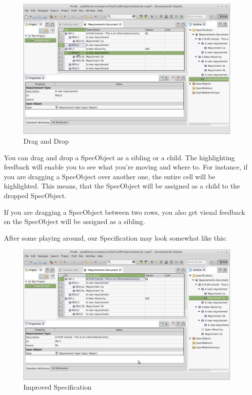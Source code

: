 \begin{figure}[h!]
\centering
\includegraphics[width=\linewidth]{../rmf-images/draganddrop.png}    
\caption{Drag and Drop}      
\label{fig:dragAndDropChild}
\end{figure}
You can drag and drop a SpecObject as a sibling or a child.  The
highlighting feedback will enable you to see what you're moving and where to.  For instance, if you are dragging a SpecObject over another one, the entire cell will be
highlighted.  This means, that the SpecObject will be assigned as a
child to the dropped SpecObject.

If you are dragging a SpecObject between two rows, you also get visual
feedback sn the SpecObject will be assigned as a sibling.

After some playing around, our Specification may look somewhat like this:

\begin{figure}[h!]
\centering      
\includegraphics[width=\linewidth]{../rmf-images/hierarchy_dad.png}      
\caption{Improved Specification}      
\label{fig:improvedSpec}
\end{figure}

